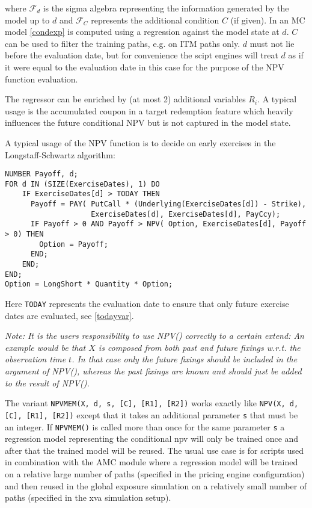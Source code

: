 where $\mathcal{F}_d$ is the sigma algebra representing the information generated by the model up to $d$ and
$\mathcal{F}_C$ represents the additional condition $C$ (if given). In an MC model \ref{condexp} is computed using a
regression against the model state at $d$. $C$ can be used to filter the training paths, e.g. on ITM paths only. $d$
must not lie before the evaluation date, but for convenience the scipt engines will treat $d$ as if it were equal to the
evaluation date in this case for the purpose of the NPV function evaluation.

The regressor can be enriched by (at most 2) additional variables $R_i$. A typical usage is the accumulated coupon in a
target redemption feature which heavily influences the future conditional NPV but is not captured in the model state.

A typical usage of the NPV function is to decide on early exercises in the Longstaff-Schwartz algorithm:

\begin{verbatim}
NUMBER Payoff, d;
FOR d IN (SIZE(ExerciseDates), 1) DO
    IF ExerciseDates[d] > TODAY THEN
      Payoff = PAY( PutCall * (Underlying(ExerciseDates[d]) - Strike),
                    ExerciseDates[d], ExerciseDates[d], PayCcy);
      IF Payoff > 0 AND Payoff > NPV( Option, ExerciseDates[d], Payoff > 0) THEN
        Option = Payoff;
      END;
    END;
END;
Option = LongShort * Quantity * Option;
\end{verbatim}

Here \verb+TODAY+ represents the evaluation date to ensure that only future exercise dates are evaluated, see
\ref{todayvar}.

{\em Note: It is the users responsibility to use NPV() correctly to a certain extend: An example would be that $X$ is
  composed from both past and future fixings w.r.t. the observation time $t$. In that case only the future fixings
  should be included in the argument of NPV(), whereas the past fixings are known and should just be added to the result
  of NPV().}

The variant {\tt NPVMEM(X, d, s, [C], [R1], [R2])} works exactly like {\tt NPV(X, d, [C], [R1], [R2])} except that it
takes an additional parameter \verb+s+ that must be an integer. If \verb+NPVMEM()+ is called more than once for the same
parameter \verb+s+ a regression model representing the conditional npv will only be trained once and after that the
trained model will be reused. The usual use case is for scripts used in combination with the AMC module where a
regression model will be trained on a relative large number of paths (specified in the pricing engine configuration) and
then reused in the global exposure simulation on a relatively small number of paths (specified in the xva simulation
setup).

